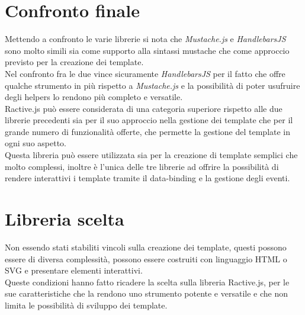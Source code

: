 \clearpage
\section{Confronto finale}
Mettendo a confronto le varie librerie si nota che \textit{Mustache.js} e \textit{HandlebarsJS} sono molto simili sia come supporto alla sintassi mustache che come approccio previsto per la creazione dei template.\\
Nel confronto fra le due vince sicuramente \textit{HandlebarsJS} per il fatto che offre qualche strumento in più rispetto a \textit{Mustache.js} e la possibilità  di poter usufruire degli helpers lo rendono più completo e versatile.\\
Ractive.js può essere considerata di una categoria superiore rispetto alle due librerie precedenti sia per il suo approccio nella gestione dei template che per il grande numero di funzionalità offerte, che permette la gestione del template in ogni suo aspetto.\\
Questa libreria può essere utilizzata sia per la creazione di template semplici che molto complessi, inoltre è l'unica delle tre librerie ad offrire la possibilità di rendere interattivi i template tramite il data-binding e la gestione degli eventi.


\FloatBarrier
\section{Libreria scelta}
Non essendo stati stabiliti vincoli sulla creazione dei template,  questi possono essere di diversa complessità, possono essere costruiti con linguaggio HTML o SVG e presentare elementi interattivi.\\ Queste condizioni hanno fatto ricadere la scelta sulla libreria Ractive.js, per le sue caratteristiche che la rendono uno strumento potente e versatile e che non limita le possibilità di sviluppo dei template.
